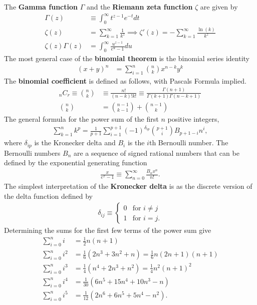 The \textbf{Gamma function} $\Gamma$ and the \textbf{Riemann zeta function} $\zeta$ are given by
\begin{align}
\Gamma(z) &\equiv\int_{0}^{\infty}t^{z-1}e^{-t}dt \\
\zeta(z)&=\sum_{k=1}^{\infty}\frac{1}{k^z}\implies \zeta'(z)=-\sum_{k=1}^{\infty}\frac{\ln(k)}{k^z} \\
\zeta(z)\Gamma(z)&=\int_{0}^{\infty}\frac{u^{z-1}}{e^u-1}du
\end{align}
The most general case of the \textbf{binomial theorem}  is the binomial series identity 
\begin{align}
(x+y)^n &= \sum_{i=1}^{n} {{n}\choose{k}}x^{n-k}y^{k}
\end{align}
The \textbf{binomial coefficient} is defined as follows, with Pascals Formula implied.
\begin{align}
_nC_r\equiv{{n}\choose{k}} &\equiv \frac{n!}{(n-k)!k!} \equiv \frac{\Gamma(n+1)}{\Gamma(k+1)\Gamma(n-k+1)} \\
{{n}\choose{k}}&={{n-1}\choose{k-1}}+{{n-1}\choose{k}}
\end{align}
The general formula for the power sum of the first $n$ positive integers, 
\begin{align}
\sum_{k=1}^{n}k^p=\frac{1}{p+1}\sum_{i=1}^{p+1}(-1)^{\delta_{ip}}{{p+1}\choose{i}}B_{p+1-i}n^i,
\end{align}
where $\delta_{ip}$ is the Kronecker delta  and $B_i$ is the $i$th Bernoulli number. The Bernoulli numbers $B_n$ are a sequence of signed rational numbers that can be defined by the exponential generating function 
\begin{align}
\frac{x}{e^x-1}\equiv\sum_{n=0}^{\infty}\frac{B_nx^n}{n!}.
\end{align}
The simplest interpretation of the \textbf{Kronecker delta} is as the discrete version of the delta function defined by 
\begin{align}
\delta_{ij}\equiv
\begin{cases}
0 & \textrm{for } i \neq j \\
1 & \textrm{for } i = j.
\end{cases}
\end{align}
Determining the sums for the first few terms of the power sum give
\begin{align}
\sum_{i=0}^{n}i   &=\frac{1}{2}n(n+1) \\
\sum_{i=0}^{n}i^2 &=\frac{1}{6}(2n^3+3n^2+n)=\frac{1}{6}n(2n+1)(n+1) \\
\sum_{i=0}^{n}i^3 &=\frac{1}{4}(n^4+2n^3+n^2)=\frac{1}{4}n^2(n+1)^2 \\
\sum_{i=0}^{n}i^4 &=\frac{1}{30}(6n^5+15n^4+10n^3-n) \\
\sum_{i=0}^{n}i^5 &=\frac{1}{12}(2n^6+6n^5+5n^4-n^2).
\end{align}
